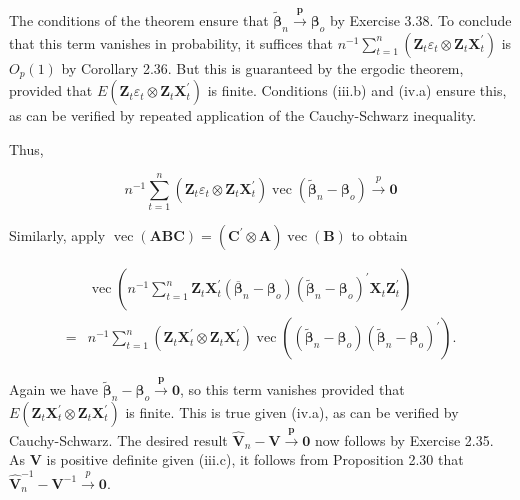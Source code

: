 \documentclass[10pt]{article}
\begin{document}
The conditions of the theorem ensure that $\tilde{\boldsymbol{\beta}}_{n} \xrightarrow{\boldsymbol{p}} \boldsymbol{\beta}_{o}$ by Exercise 3.38. To conclude that this term vanishes in probability, it suffices that $n^{-1} \sum_{t=1}^{n} \left(\mathbf{Z}_{t} \varepsilon_{t} \otimes \mathbf{Z}_{t} \mathbf{X}_{t}^{\prime}\right)$ is $O_{p}(1)$ by Corollary 2.36. But this is guaranteed by the ergodic theorem, provided that $E\left(\mathbf{Z}_{t} \varepsilon_{t} \otimes \mathbf{Z}_{t} \mathbf{X}_{t}^{\prime}\right)$ is finite. Conditions (iii.b) and (iv.a) ensure this, as can be verified by repeated application of the Cauchy-Schwarz inequality.

Thus,

$$
n^{-1} \sum_{t=1}^{n}\left(\mathbf{Z}_{t} \varepsilon_{t} \otimes \mathbf{Z}_{t} \mathbf{X}_{t}^{\prime}\right) \operatorname{vec}\left(\tilde{\boldsymbol{\beta}}_{n}-\boldsymbol{\beta}_{o}\right) \xrightarrow{p} \mathbf{0}
$$

Similarly, apply $\operatorname{vec}(\mathbf{A B C})=\left(\mathbf{C}^{\prime} \otimes \mathbf{A}\right) \operatorname{vec}(\mathbf{B})$ to obtain

$$
\begin{aligned}
& \operatorname{vec}\left(n^{-1} \sum_{t=1}^{n} \mathbf{Z}_{t} \mathbf{X}_{t}^{\prime}\left(\overline{\boldsymbol{\beta}}_{n}-\boldsymbol{\beta}_{o}\right)\left(\tilde{\boldsymbol{\beta}}_{n}-\boldsymbol{\beta}_{o}\right)^{\prime} \mathbf{X}_{t} \mathbf{Z}_{t}^{\prime}\right) \\
= & n^{-1} \sum_{t=1}^{n}\left(\mathbf{Z}_{t} \mathbf{X}_{t}^{\prime} \otimes \mathbf{Z}_{t} \mathbf{X}_{t}^{\prime}\right) \operatorname{vec}\left(\left(\tilde{\boldsymbol{\beta}}_{n}-\boldsymbol{\beta}_{o}\right)\left(\tilde{\boldsymbol{\beta}}_{n}-\boldsymbol{\beta}_{o}\right)^{\prime}\right) .
\end{aligned}
$$

Again we have $\tilde{\boldsymbol{\beta}}_{n}-\boldsymbol{\beta}_{o} \xrightarrow{\boldsymbol{p}} \mathbf{0}$, so this term vanishes provided that $E\left(\mathbf{Z}_{t} \mathbf{X}_{t}^{\prime} \otimes \mathbf{Z}_{t} \mathbf{X}_{t}^{\prime}\right)$ is finite. This is true given (iv.a), as can be verified by Cauchy-Schwarz. The desired result $\hat{\mathbf{V}}_{n}-\mathbf{V} \xrightarrow{\boldsymbol{p}} \mathbf{0}$ now follows by Exercise 2.35. As $\mathbf{V}$ is positive definite given (iii.c), it follows from Proposition 2.30 that $\hat{\mathbf{V}}_{n}^{-1}-\mathbf{V}^{-1} \xrightarrow{p} \mathbf{0}$.
\end{document}
